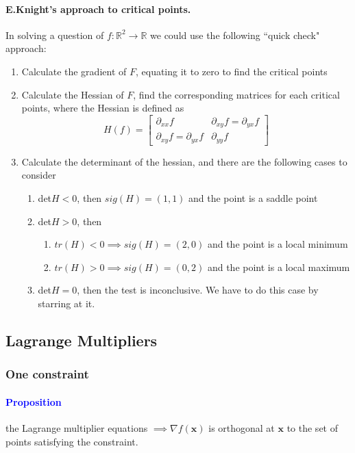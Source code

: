 \documentclass[11pt]{article}
\newcommand{\tb}[1]{\textbf{#1}}
\newcommand{\real}[0]{\mathbb{R}}
\newcommand{\vx}[0]{\tb{x}}
\begin{document}
\paragraph{E.Knight's approach to critical points.}In solving a question of $f:\real^2 \rightarrow{} \real$ we could use the following ``quick check" approach:
\begin{enumerate}
    \item Calculate the gradient of $F$, equating it to zero to find the critical points
    \item Calculate the Hessian of $F$, find the corresponding matrices for each critical points, where the Hessian is defined as
    \begin{equation*} H(f) = 
        \begin{bmatrix}
             \partial_{xx}f & \partial_{xy}f = \partial_{yx}f \\
             \partial_{xy}f = \partial_{yx}f & \partial_{yy}f
        \end{bmatrix}
    \end{equation*}
    \item Calculate the determinant of the hessian, and there are the following cases to consider
    \begin{enumerate}
        \item det$H<0$, then $sig(H) = (1,1)$ and the point is a saddle point
        \item det$H>0$, then
            \begin{enumerate}
                \item $tr(H)<0 \implies sig(H) = (2,0)$ and the point is a local minimum
                \item $tr(H)>0 \implies sig(H) = (0,2)$ and the point is a local maximum
            \end{enumerate}
        \item det$H=0$, then the test is inconclusive. We have to do this case by starring at it.
    \end{enumerate}
\end{enumerate}
\subsection{Lagrange Multipliers}
\subsubsection{One constraint}
\paragraph{\textcolor{blue}{Proposition}}
the Lagrange multiplier equations $\implies \nabla f(\vx)$ is orthogonal at $\vx$ to the set of points satisfying the constraint.
\end{document}
